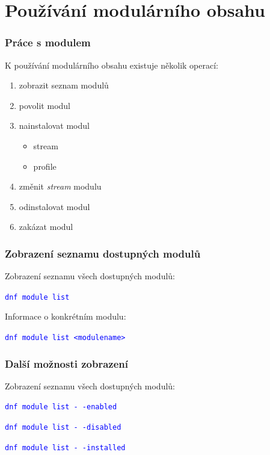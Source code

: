 \documentclass[12pt]{beamer}
\newcommand{\tc}[1]{
	\textcolor{blue}{#1}
}
\begin{document}
\section{Používání modulárního obsahu}

\begin{frame}
\frametitle{Práce s modulem}

K používání modulárního obsahu existuje několik operací:

\begin{enumerate}
	\item zobrazit seznam modulů
	\item povolit modul
	\item nainstalovat modul
	\begin{itemize}
		\item stream
		\item profile
	\end{itemize}
	\item změnit \textit{stream} modulu
	\item odinstalovat modul
	\item zakázat modul
\end{enumerate}
\end{frame}

\begin{frame}
\frametitle{Zobrazení seznamu dostupných modulů}

Zobrazení seznamu všech dostupných modulů:

\begin{center}
	\tc{\texttt{dnf module list}}
\end{center}

Informace o konkrétním modulu:

\begin{center}
	\tc{\texttt{dnf module list <modulename>}}
\end{center}
\end{frame}

\begin{frame}
\frametitle{Další možnosti zobrazení}

Zobrazení seznamu všech dostupných modulů:

\begin{center}
	\tc{\texttt{dnf module list -\,-enabled}}
	
	\tc{\texttt{dnf module list -\,-disabled}}
	
	\tc{\texttt{dnf module list -\,-installed}}	
\end{center}
\end{frame}
\end{document}
